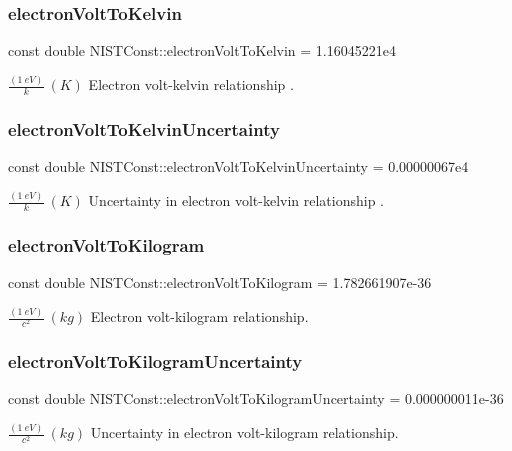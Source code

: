 \subsubsection{\texorpdfstring{electron\+Volt\+To\+Kelvin}{electronVoltToKelvin}}
{\footnotesize\ttfamily const double N\+I\+S\+T\+Const\+::electron\+Volt\+To\+Kelvin = 1.\+16045221e4}

$\frac{(1\ eV)}{k} \ (K)$ Electron volt-\/kelvin relationship . \mbox{\label{group___n_i_s_t_const-_electron_volt_ga6754c9f090abf4bff80621978bf85eb1}} 
\subsubsection{\texorpdfstring{electron\+Volt\+To\+Kelvin\+Uncertainty}{electronVoltToKelvinUncertainty}}
{\footnotesize\ttfamily const double N\+I\+S\+T\+Const\+::electron\+Volt\+To\+Kelvin\+Uncertainty = 0.\+00000067e4}

$\frac{(1\ eV)}{k} \ (K)$ Uncertainty in electron volt-\/kelvin relationship . \mbox{\label{group___n_i_s_t_const-_electron_volt_ga21481a673cb040e04f7f8f95581ece0c}} 
\subsubsection{\texorpdfstring{electron\+Volt\+To\+Kilogram}{electronVoltToKilogram}}
{\footnotesize\ttfamily const double N\+I\+S\+T\+Const\+::electron\+Volt\+To\+Kilogram = 1.\+782661907e-\/36}

$\frac{(1\ eV)}{c^2} \ (kg)$ Electron volt-\/kilogram relationship. \mbox{\label{group___n_i_s_t_const-_electron_volt_ga77aec1f5b68dd74739fe268fa4362a85}} 
\subsubsection{\texorpdfstring{electron\+Volt\+To\+Kilogram\+Uncertainty}{electronVoltToKilogramUncertainty}}
{\footnotesize\ttfamily const double N\+I\+S\+T\+Const\+::electron\+Volt\+To\+Kilogram\+Uncertainty = 0.\+000000011e-\/36}

$\frac{(1\ eV)}{c^2} \ (kg)$ Uncertainty in electron volt-\/kilogram relationship. 